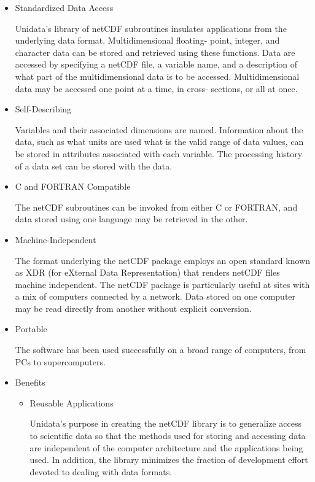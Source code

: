 \bigskip
{}
\begin{itemize}
\item Standardized Data Access

\noindent Unidata's library of netCDF subroutines insulates applications from 
the underlying data format.  Multidimensional floating- point, integer, and 
character data can be stored and retrieved using these functions.  Data are 
accessed by specifying a netCDF file, a variable name, and a description of 
what part of the multidimensional data is to be accessed.  
Multidimensional data may be accessed one point at a time, in cross-
sections, or all at once.

\item Self-Describing

\noindent Variables and their associated dimensions are named.  Information 
about the data, such as what units are used what is the valid range of data 
values, can be stored in attributes associated with each variable.  The 
processing history of a data set can be stored with the data.

\item C and FORTRAN Compatible

\noindent The netCDF subroutines can be invoked from either C or FORTRAN, 
and data stored using one language may be retrieved in the other.

\item Machine-Independent

\noindent The format underlying the netCDF package employs an open standard 
known as XDR (for eXternal Data Representation) that renders netCDF files 
machine independent.  The netCDF package is particularly useful at sites 
with a mix of computers connected by a network.  Data stored on one 
computer may be read directly from another without explicit conversion.

\item Portable

\noindent The software has been used successfully on a broad range of 
computers, from PCs to supercomputers.

\item Benefits
    \begin{itemize}
	\item Reusable Applications

\noindent Unidata's purpose in creating the netCDF library is to generalize 
access to scientific data so that the methods used for storing and 
accessing data are independent of the computer architecture and the 
applications being used.  In addition, the library minimizes the fraction of 
development effort devoted to dealing with data formats.


\end{itemize}
\end{itemize}
